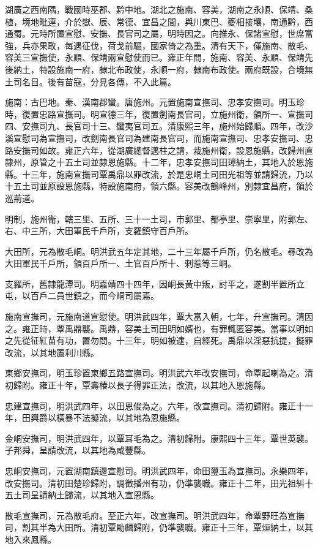 \begin{pinyinscope}
湖廣之西南隅，戰國時巫郡、黔中地。湖北之施南、容美，湖南之永順、保靖、桑植，境地毗連，介於嶽、辰、常德、宜昌之間，與川東巴、夔相接壤，南通黔，西通蜀。元時所置宣慰、安撫、長官司之屬，明時因之。向推永、保諸宣慰，世席富強，兵亦果敢，每遇征伐，荷戈前驅，國家倚之為重。清有天下，僅施南、散毛、容美三宣撫使，永順、保靖兩宣慰使而已。雍正年間，施南、容美、永順、保靖先後納土，特設施南一府，隸北布政使，永順一府，隸南布政使。兩府既設，合境無土司名目。後有苗寇，分見各傳，不入此篇。

施南：古巴地。秦、漢南郡蠻。唐施州。元置施南宣撫司、忠孝安撫司。明玉珍時，復置忠路宣撫司。明宣德三年，復置劍南長官司，立施州衛，領所一、宣撫司四、安撫司九、長官司十三、蠻夷官司五。清康熙三年，施州始歸順。四年，改沙溪宣慰司為宣撫司，改劍南長官司為建南長官司，而施南宣撫司、忠孝安撫司、忠路安撫司如故。雍正六年，從湖廣總督邁柱之請，裁施州衛，設恩施縣，改歸州直隸州，原管之十五土司並隸恩施縣。十二年，忠孝安撫司田璋納土，其地入於恩施縣。十三年，施南宣撫司覃禹鼎以罪改流，於是忠峒土司田光祖等並請歸流，乃以十五土司並原設恩施縣，特設施南府，領六縣。容美改鶴峰州，別隸宜昌府，領於巡荊道。

明制，施州衛，轄三里、五所、三十一土司，市郭里、都亭里、崇寧里，附郭左、右、中三所，大田軍民千戶所，支羅鎮守百戶所。

大田所，元為散毛峒。明洪武五年定其地，二十三年屬千戶所，仍名散毛。尋改為大田軍民千戶所，領百戶所一、土官百戶所十、剌惹等三峒。

支羅所，舊隸龍潭司。明嘉靖四十四年，因峒長黃中叛，討平之，遂割半置所立屯，以百戶二員世鎮之，而今峒司屬焉。

施南宣撫司，元施南道宣慰使。明洪武四年，覃大富入朝，七年，升宣撫司。清因之。雍正時，覃禹鼎襲。禹鼎，容美土司田明如婿也，有罪輒匿容美。當事以明如之先從征紅苗有功，置勿問。十三年，明如被逮，自經死。禹鼎以淫惡抗提，擬罪改流，以其地置利川縣。

東鄉安撫司，明玉珍置東鄉五路宣撫司。明洪武六年改安撫司，命覃起喇為之。清初歸附。雍正十年，覃壽椿以長子得罪正法，改流，以其地入恩施縣。

忠建宣撫司，明洪武四年，以田恩俊為之。六年，改宣撫司。清初歸附。雍正十一年，田興爵以橫暴不法擬流，以其地為恩施縣。

金峒安撫司，明洪武四年，以覃耳毛為之。清初歸附。康熙四十三年，覃世英襲。子邦舜，呈請改流，以其地為咸豐縣。

忠峒安撫司，元置湖南鎮邊宣慰司。明洪武四年，命田璽玉為宣撫司。永樂四年，改安撫司。清初田楚珍歸附，調徵播州有功，仍準襲職。雍正十二年，田光祖糾十五土司呈請納土歸流，以其地入宣恩縣。

散毛宣撫司，元為散毛府。至正六年，改宣撫司。明洪武四年，命覃野旺為宣撫司，割其半為大田所。清初覃勛麟歸附，仍準襲職。雍正十三年，覃烜納土，以其地入來鳳縣。


\end{pinyinscope}
